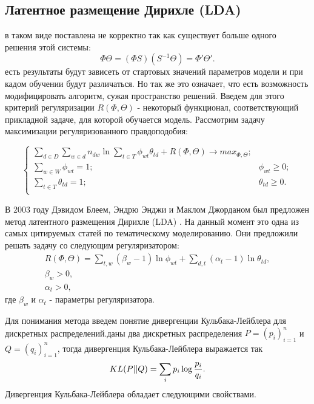 \subsection{Латентное размещение Дирихле (LDA)}

 в таком виде поставлена не корректно так как существует больше одного решения этой системы:
\begin{equation}
\Phi\Theta = (\Phi S)(S^{-1}\Theta)=\Phi'\Theta'.
\end{equation}
 есть результаты будут зависеть от стартовых значений параметров модели и при кадом обучении будут различаться. Но так же это означает, что есть возможность модифицировать алгоритм, сужая пространство решений. Введем для этого критерий регуляризации $R(\Phi,\Theta)$ - некоторый функционал, соответствующий прикладной задаче, для которой обучается модель. Рассмотрим задачу максимизации регуляризованного правдоподобия:

\begin{equation}
\begin{cases}
    \sum_{d \in D} \sum_{w \in d} n_{dw} \ln{\sum_{t \in T} \phi_{wt} \theta_{td} } + R(\Phi,\Theta) \rightarrow max_{\Phi,\Theta};\\
    \sum_{w \in W}\phi_{wt} = 1; &\phi_{wt} \ge 0;\\
    \sum_{t \in T}\theta_{td} = 1; &\theta_{td} \ge 0.\\
\end{cases}
\end{equation}

В 2003 году Дэвидом Блеем, Эндрю Энджи и Маклом Джорданом был предложен метод латентного размещения Дирихле (LDA) \cite{Blei}. На данный момент это одна из самых цитируемых статей по тематическому моделированию. Они предложили решать задачу со следующим регуляризатором:
\begin{equation}
\begin{aligned}
R(\Phi,\Theta) = \sum_{t,w}{(\beta_w-1)\ln{\phi_{wt}}} + \sum_{d,t}{(\alpha_t-1)\ln{\theta_{td}}},\\
\beta_w > 0, \\
\alpha_t > 0,
\end{aligned}
\end{equation}
где $\beta_w$ и $\alpha_t$ - параметры регуляризатора.

Для понимания метода введем понятие дивергенции Кульбака-Лейблера для дискретных распределений. даны два дискретных распределения $P=(p_i)_{i=1}^n$ и $Q=(q_i)_{i=1}^n$, тогда дивергенция Кульбака-Лейблера выражается так
\begin{equation}
KL(P||Q)=\sum_i{p_i \log{{p_i}\over{q_i}}}.
\end{equation}
Дивергенция Кульбака-Лейблера обладает следующими свойствами.

